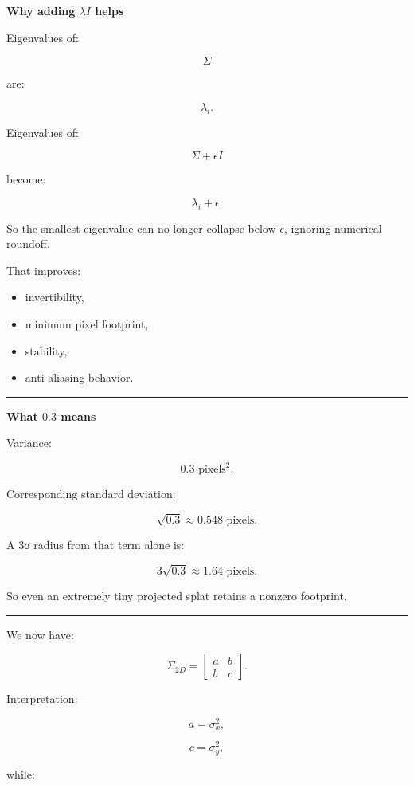 \textbf{Why adding \(\lambda I\) helps}

Eigenvalues of:

\[
\Sigma
\]

are:

\[
\lambda_i.
\]

Eigenvalues of:

\[
\Sigma+\epsilon I
\]

become:

\[
\lambda_i+\epsilon.
\]

So the smallest eigenvalue can no longer collapse below \(\epsilon\), ignoring numerical roundoff.

That improves:

\begin{itemize}
\tightlist
\item
  invertibility,
\item
  minimum pixel footprint,
\item
  stability,
\item
  anti-aliasing behavior.
\end{itemize}

\begin{center}\rule{0.5\linewidth}{0.5pt}\end{center}

\textbf{What \(0.3\) means}

Variance:

\[
0.3\text{ pixels}^2.
\]

Corresponding standard deviation:

\[
\sqrt{0.3}
\approx0.548\text{ pixels}.
\]

A 3σ radius from that term alone is:

\[
3\sqrt{0.3}
\approx1.64\text{ pixels}.
\]

So even an extremely tiny projected splat retains a nonzero footprint.

\begin{center}\rule{0.5\linewidth}{0.5pt}\end{center}

We now have:

\[
\boxed{
\Sigma_{2D}
=
\begin{bmatrix}
a&b\\
b&c
\end{bmatrix}.
}
\]

Interpretation:

\[
a=\sigma_x^2,
\]

\[
c=\sigma_y^2,
\]

while:

